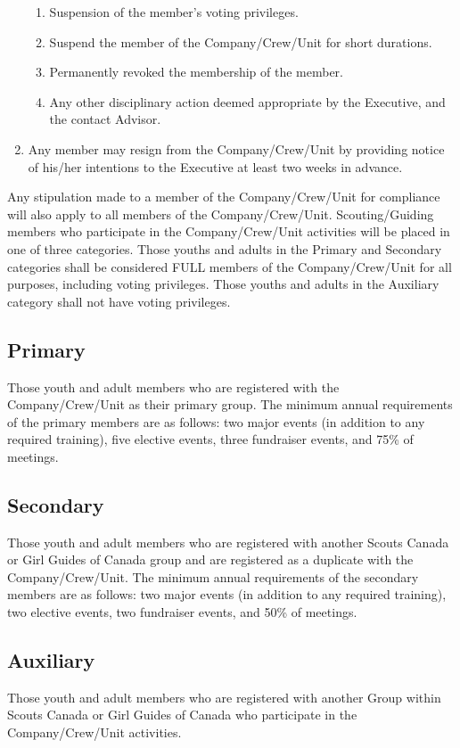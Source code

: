 \begin{enumerate}
    \begin{enumerate}
        \item Suspension of the member's voting privileges.
        \item Suspend the member of the Company/Crew/Unit for short durations.
        \item Permanently revoked the membership of the member.
        \item Any other disciplinary action deemed appropriate by the Executive, and the contact Advisor.
    \end{enumerate}
    \item Any member may resign from the Company/Crew/Unit by providing notice of his/her intentions to the Executive at least two weeks in advance.
\end{enumerate}
Any stipulation made to a member of the Company/Crew/Unit for compliance will also apply to all members of the Company/Crew/Unit.
Scouting/Guiding members who participate in the Company/Crew/Unit activities will be placed in one of three categories.
Those youths and adults in the Primary and Secondary categories shall be considered FULL members of the Company/Crew/Unit for all purposes, including voting privileges.
Those youths and adults in the Auxiliary category shall not have voting privileges.

\subsection{Primary}\label{subsec:primary}
Those youth and adult members who are registered with the Company/Crew/Unit as their primary group.
The minimum annual requirements of the primary members are as follows: two major events (in addition to any required training), five elective events, three fundraiser events, and 75\% of meetings.

\subsection{Secondary}\label{subsec:secondary}
Those youth and adult members who are registered with another Scouts Canada or Girl Guides of Canada group and are registered as a duplicate with the Company/Crew/Unit.
The minimum annual requirements of the secondary members are as follows: two major events (in addition to any required training), two elective events, two fundraiser events, and 50\% of meetings.

\subsection{Auxiliary}\label{subsec:auxiliary}
Those youth and adult members who are registered with another Group within Scouts Canada or Girl Guides of Canada who participate in the Company/Crew/Unit activities.
